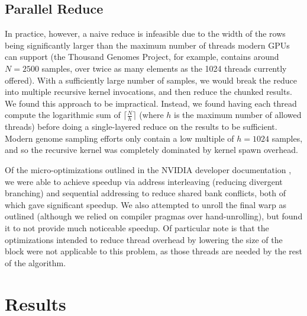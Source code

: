 \documentclass[12pt]{article}
\begin{document}
\subsection{Parallel Reduce}

In practice, however, a naive reduce is infeasible due to the width of the rows
being significantly larger than the maximum number of threads modern GPUs can
support (the Thousand Genomes Project, for example, contains around $N = 2500$
samples, over twice as many elements as the 1024 threads currently offered).
With a sufficiently large number of samples, we would break the reduce into
multiple recursive kernel invocations, and then reduce the chunked results.
We found this approach to be impractical. Instead, we found having each thread
compute the logarithmic sum of $\lceil\frac{N}{h}\rceil$ (where $h$ is the
maximum number of allowed threads) before doing a single-layered reduce on the
results to be sufficient. Modern genome sampling efforts only contain a low
multiple of $h = 1024$ samples, and so the recursive kernel was completely
dominated by kernel spawn overhead.

Of the micro-optimizations outlined in the NVIDIA developer
documentation \cite{reduceopt}, we were able to achieve speedup via address
interleaving (reducing divergent branching) and sequential addressing to reduce
shared bank conflicts, both of which gave significant speedup. We also
attempted to unroll the final warp as outlined (although we relied on compiler
pragmas over hand-unrolling), but found it to not provide much noticeable
speedup. Of particular note is that the optimizations intended to reduce
thread overhead by lowering the size of the block were not applicable to this
problem, as those threads are needed by the rest of the algorithm.

\newpage
\section{Results}
\end{document}
